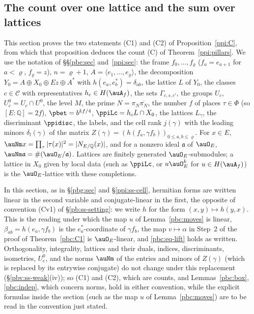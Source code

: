 \documentclass[10pt]{amsart}
\theoremstyle{definition}
\theoremstyle{remark}
\newcommand{\Q}{\mathbb Q}
\providecommand{\auPl}{\Phi}
\providecommand{\aubar}[1]{\overline{#1}}
\begin{document}
\subsection{The count over one lattice and the sum over lattices}\label{pbc:sec}

This section proves the two statements (C1) and (C2) of Proposition~\ref{ppi:C}, from which that
proposition deduces the count (C) of Theorem~\ref{ppi:pillars}. We use the notation of
\S\S\ref{pbe:sec} and~\ref{ppi:sec}: the frame $f_0,\dots,f_\varrho$ ($f_a=e_{a+1}$ for $a<\varrho$,
$f_\varrho=z$), $n=\varrho+1$, $A=\langle e_1,\dots,e_\varrho\rangle$, the decomposition $Y_0=A\oplus
X_0\oplus Ez\oplus A^*$ with $h(e_a,e_b^*)=\delta_{ab}$, the lattice $L$ of $Y_0$, the classes
$c\in\mathcal C$ with representatives $h_c\in H(\auA_f)$, the sets $\Gamma_{c,s,c'}$, the groups $U_c$,
$U_c^0=U_c\cap U^0$, the level $M$, the prime $N=\pi_N\aubar{\pi_N}$, the number $f$ of places
$\tau\in\auPl$ (so $[E:\Q]=2f$), $\pbet=b^{kf/4}$, $\ppiLc=h_cL\cap X_0$, the lattices $L_\gamma$, the
discriminant $\ppidisc$, the labels, and the cell rank $j(\gamma)$ with the leading minors
$\delta_l(\gamma)$ of the matrix $Z(\gamma)=(h(f_a,\gamma f_b))_{0\le a,b\le\varrho}$. For $x\in E$,
$\auNm x=\prod_{\tau}|\tau(x)|^2=|N_{E/\Q}(x)|$, and for a nonzero ideal $\mathfrak a$ of $\auO_E$,
$\auNm\mathfrak a=\#(\auO_E/\mathfrak a)$. Lattices are finitely generated $\auO_E$-submodules; a
lattice in $X_0$ given by local data (such as $\ppiLc$, or $u\auO_E^k$ for $u\in H(\auA_f)$) is the
$\auO_E$-lattice with these completions.

In this section, as in \S\ref{pbg:sec} and \S\ref{ppi:ss-cell}, hermitian forms are written linear in the second variable
and conjugate-linear in the first, the opposite of convention (Cv1) of \S\ref{pb:ss-setting}: we write $h$ for the form
$(x,y)\mapsto h(y,x)$. This is the reading under which the map $u$ of Lemma~\ref{pbc:moves} is linear, $\beta_{ab}=h(e_a,\gamma f_b)$
is the $e_a^*$-coordinate of $\gamma f_b$, the map $v\mapsto\alpha$ in Step~2 of the proof of Theorem~\ref{pbc:C1} is
$\auO_E$-linear, and \eqref{pbc:eq-lift} holds as written. Orthogonality, integrality, lattices and their duals, indices,
discriminants, isometries, $U_c^0$, and the norms $\auNm$ of the entries and minors of $Z(\gamma)$ (which is replaced by its
entrywise conjugate) do not change under this replacement (\S\ref{pbv:ss-weak}(iv)); so (C1) and (C2), which are counts,
and Lemmas~\ref{pbc:box}, \ref{pbc:indep}, which concern norms, hold in either convention, while the explicit formulas
inside the section (such as the map $u$ of Lemma~\ref{pbc:moves}) are to be read in the convention just stated.
\end{document}
